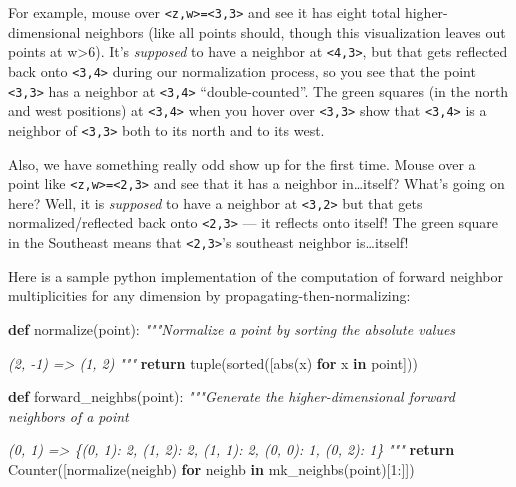 \documentclass[]{article}
\newenvironment{Shaded}{}{}
\newcommand{\BuiltInTok}[1]{#1}
\newcommand{\CommentTok}[1]{\textcolor[rgb]{0.38,0.63,0.69}{\textit{#1}}}
\newcommand{\ControlFlowTok}[1]{\textcolor[rgb]{0.00,0.44,0.13}{\textbf{#1}}}
\newcommand{\DecValTok}[1]{\textcolor[rgb]{0.25,0.63,0.44}{#1}}
\newcommand{\KeywordTok}[1]{\textcolor[rgb]{0.00,0.44,0.13}{\textbf{#1}}}
\newcommand{\NormalTok}[1]{#1}
\begin{document}
For example, mouse over
\texttt{\textless{}z,w\textgreater{}=\textless{}3,3\textgreater{}} and see it
has eight total higher-dimensional neighbors (like all points should, though
this visualization leaves out points at w\textgreater6). It's \emph{supposed} to
have a neighbor at \texttt{\textless{}4,3\textgreater{}}, but that gets
reflected back onto \texttt{\textless{}3,4\textgreater{}} during our
normalization process, so you see that the point
\texttt{\textless{}3,3\textgreater{}} has a neighbor at
\texttt{\textless{}3,4\textgreater{}} ``double-counted''. The green squares (in
the north and west positions) at \texttt{\textless{}3,4\textgreater{}} when you
hover over \texttt{\textless{}3,3\textgreater{}} show that
\texttt{\textless{}3,4\textgreater{}} is a neighbor of
\texttt{\textless{}3,3\textgreater{}} both to its north and to its west.

Also, we have something really odd show up for the first time. Mouse over a
point like \texttt{\textless{}z,w\textgreater{}=\textless{}2,3\textgreater{}}
and see that it has a neighbor in\ldots itself? What's going on here? Well, it
is \emph{supposed} to have a neighbor at \texttt{\textless{}3,2\textgreater{}}
but that gets normalized/reflected back onto
\texttt{\textless{}2,3\textgreater{}} --- it reflects onto itself! The green
square in the Southeast means that \texttt{\textless{}2,3\textgreater{}}'s
southeast neighbor is\ldots itself!

Here is a sample python implementation of the computation of forward neighbor
multiplicities for any dimension by propagating-then-normalizing:

\begin{Shaded}
\begin{Highlighting}[]
\KeywordTok{def}\NormalTok{ normalize(point):}
    \CommentTok{"""Normalize a point by sorting the absolute values}

\CommentTok{    (2, {-}1)}
\CommentTok{    => (1, 2)}
\CommentTok{    """}
    \ControlFlowTok{return} \BuiltInTok{tuple}\NormalTok{(}\BuiltInTok{sorted}\NormalTok{([}\BuiltInTok{abs}\NormalTok{(x) }\ControlFlowTok{for}\NormalTok{ x }\KeywordTok{in}\NormalTok{ point]))}

\KeywordTok{def}\NormalTok{ forward\_neighbs(point):}
    \CommentTok{"""Generate the higher{-}dimensional forward neighbors of a point}

\CommentTok{    (0, 1)}
\CommentTok{    => \{(0, 1): 2, (1, 2): 2, (1, 1): 2, (0, 0): 1, (0, 2): 1\}}
\CommentTok{    """}
    \ControlFlowTok{return}\NormalTok{ Counter([normalize(neighb) }\ControlFlowTok{for}\NormalTok{ neighb }\KeywordTok{in}\NormalTok{ mk\_neighbs(point)[}\DecValTok{1}\NormalTok{:]])}
\end{Highlighting}
\end{Shaded}
\end{document}
